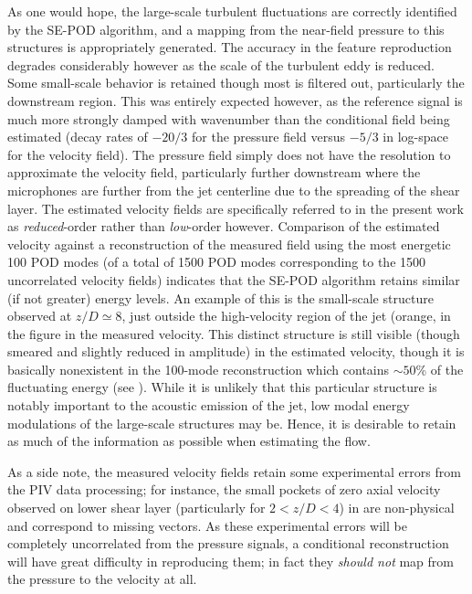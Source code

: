 As one would hope, the large-scale turbulent fluctuations are correctly identified by the SE-POD algorithm, and a mapping from the near-field pressure to this structures is appropriately generated.
The accuracy in the feature reproduction degrades considerably however as the scale of the turbulent eddy is reduced.
Some small-scale behavior is retained though most is filtered out, particularly the downstream region.
This was entirely expected however, as the reference signal is much more strongly damped with wavenumber than the conditional field being estimated (decay rates of $-20/3$ for the pressure field versus $-5/3$ in log-space for the velocity field).
The pressure field simply does not have the resolution to approximate the velocity field, particularly further downstream where the microphones are further from the jet centerline due to the spreading of the shear layer.
The estimated velocity fields are specifically referred to in the present work as \textit{reduced}-order rather than \textit{low}-order however.
Comparison of the estimated velocity against a reconstruction of the measured field using the most energetic 100 POD modes (of a total of 1500 POD modes corresponding to the 1500 uncorrelated velocity fields) indicates that the SE-POD algorithm retains similar (if not greater) energy levels.
An example of this is the small-scale structure observed at $z/D \simeq 8$, just outside the high-velocity region of the jet (orange, in the figure in the measured velocity.
This distinct structure is still visible (though smeared and slightly reduced in amplitude) in the estimated velocity, though it is basically nonexistent in the 100-mode reconstruction which contains $\sim 50$\% of the fluctuating energy (see ).
While it is unlikely that this particular structure is notably important to the acoustic emission of the jet, low modal energy modulations of the large-scale structures may be.
Hence, it is desirable to retain as much of the information as possible when estimating the flow.

As a side note, the measured velocity fields retain some experimental errors from the PIV data processing; for instance, the small pockets of zero axial velocity observed on lower shear layer (particularly for $2 < z/D < 4$) in  are non-physical and correspond to missing vectors. 
As these experimental errors will be completely uncorrelated from the pressure signals, a conditional reconstruction will have great difficulty in reproducing them; in fact they \textit{should not} map from the pressure to the velocity at all.

